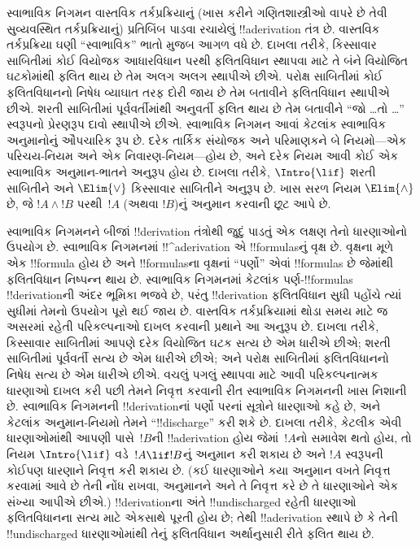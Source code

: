 \documentclass[../../../include/open-logic-section]{subfiles}
\begin{document}
      {}
      {}


સ્વાભાવિક નિગમન વાસ્તવિક તર્કપ્રક્રિયાનું (ખાસ કરીને ગણિતશાસ્ત્રીઓ
વાપરે છે તેવી સુવ્યવસ્થિત તર્કપ્રક્રિયાનું) પ્રતિબિંબ પાડવા રચાયેલું
!!a{derivation} તંત્ર છે. વાસ્તવિક તર્કપ્રક્રિયા ઘણી ``સ્વાભાવિક''
ભાતો મુજબ આગળ વધે છે. દાખલા તરીકે, કિસ્સાવાર સાબિતીમાં કોઈ વિયોજક
આધારવિધાન પરથી ફલિતવિધાન સ્થાપવા માટે તે બંને વિયોજિત ઘટકોમાંથી
ફલિત થાય છે તેમ અલગ અલગ સ્થાપીએ છીએ. પરોક્ષ સાબિતીમાં કોઈ
ફલિતવિધાનનો નિષેધ વ્યાઘાત તરફ દોરી જાય છે તેમ બતાવીને ફલિતવિધાન
સ્થાપીએ છીએ. શરતી સાબિતીમાં પૂર્વવર્તીમાંથી અનુવર્તી ફલિત થાય છે તેમ
બતાવીને ``જો \dots તો \dots'' સ્વરૂપનો પ્રેરણરૂપ દાવો સ્થાપીએ છીએ.
સ્વાભાવિક નિગમન આવાં કેટલાંક સ્વાભાવિક અનુમાનોનું ઔપચારિક રૂપ છે.
દરેક તાર્કિક સંયોજક અને પરિમાણકને બે નિયમો—એક પરિચય-નિયમ અને એક
નિવારણ-નિયમ—હોય છે, અને દરેક નિયમ આવી કોઈ એક સ્વાભાવિક અનુમાન-ભાતને
અનુરૂપ હોય છે. દાખલા તરીકે, $\Intro{\lif}$ શરતી સાબિતીને અને
$\Elim{\lor}$ કિસ્સાવાર સાબિતીને અનુરૂપ છે. ખાસ સરળ નિયમ
$\Elim{\land}$ છે, જે $!A \land !B$ પરથી~$!A$ (અથવા $!B$)નું અનુમાન
કરવાની છૂટ આપે છે.

સ્વાભાવિક નિગમનને બીજાં !!{derivation} તંત્રોથી જુદું પાડતું એક
લક્ષણ તેનો ધારણાઓનો ઉપયોગ છે. સ્વાભાવિક નિગમનમાં !!^a{derivation} એ
!!{formula}sનું વૃક્ષ છે. વૃક્ષના મૂળે એક !!{formula} હોય છે અને
!!{formula}sના વૃક્ષનાં ``પર્ણો'' એવાં !!{formula}s છે જેમાંથી
ફલિતવિધાન નિષ્પન્ન થાય છે. સ્વાભાવિક નિગમનમાં કેટલાંક
પર્ણ-!!{formula}s !!{derivation}ની અંદર
ભૂમિકા ભજવે છે, પરંતુ !!{derivation} ફલિતવિધાન સુધી પહોંચે ત્યાં સુધીમાં
તેમનો ઉપયોગ પૂરો થઈ જાય છે. વાસ્તવિક તર્કપ્રક્રિયામાં થોડા સમય માટે જ
અસરમાં રહેતી પરિકલ્પનાઓ દાખલ કરવાની પ્રથાને આ અનુરૂપ છે. દાખલા તરીકે,
કિસ્સાવાર સાબિતીમાં આપણે દરેક વિયોજિત ઘટક સત્ય છે એમ ધારીએ છીએ; શરતી
સાબિતીમાં પૂર્વવર્તી સત્ય છે એમ ધારીએ છીએ; અને પરોક્ષ સાબિતીમાં
ફલિતવિધાનનો નિષેધ સત્ય છે એમ ધારીએ છીએ. વચલું પગલું સ્થાપવા માટે આવી
પરિકલ્પનાત્મક ધારણાઓ દાખલ કરી પછી તેમને નિવૃત્ત કરવાની રીત સ્વાભાવિક
નિગમનની ખાસ નિશાની છે. સ્વાભાવિક નિગમનની !!{derivation}નાં પર્ણો પરનાં
સૂત્રોને ધારણાઓ કહે છે, અને કેટલાંક અનુમાન-નિયમો તેમને
``!!{discharge}'' કરી શકે છે. દાખલા તરીકે, કેટલીક એવી ધારણાઓમાંથી
આપણી પાસે~$!B$ની !!a{derivation} હોય જેમાં~$!A$નો સમાવેશ થતો હોય, તો
નિયમ $\Intro{\lif}$ વડે~$!A \lif !B$નું અનુમાન કરી શકાય છે અને
$!A$ સ્વરૂપની કોઈપણ ધારણાને નિવૃત્ત કરી શકાય છે. (કઈ ધારણાઓને
કયા અનુમાન વખતે નિવૃત્ત કરવામાં આવે છે તેની નોંધ રાખવા, અનુમાનને અને
તે નિવૃત્ત કરે છે તે ધારણાઓને એક સંખ્યા આપીએ છીએ.) !!{derivation}ના
અંતે !!{undischarged} રહેતી ધારણાઓ ફલિતવિધાનના સત્ય માટે એકસાથે પૂરતી
હોય છે; તેથી !!a{derivation} સ્થાપે છે કે તેની !!{undischarged}
ધારણાઓમાંથી તેનું ફલિતવિધાન અર્થાનુસારી રીતે ફલિત થાય છે.
\end{document}
